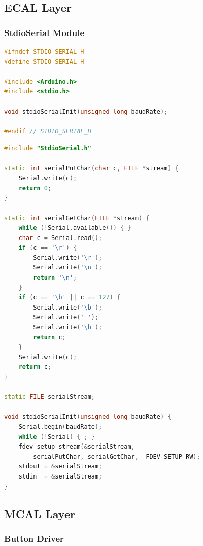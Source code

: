 \subsection{ECAL Layer}

\subsubsection{StdioSerial Module}

\begin{lstlisting}[language=C++, caption=lib/StdioSerial/StdioSerial.h --- printf-to-UART bridge, label=lst:appendix_stdio_h]
#ifndef STDIO_SERIAL_H
#define STDIO_SERIAL_H

#include <Arduino.h>
#include <stdio.h>

void stdioSerialInit(unsigned long baudRate);

#endif // STDIO_SERIAL_H
\end{lstlisting}

\begin{lstlisting}[language=C++, caption=lib/StdioSerial/StdioSerial.cpp --- bridge implementation, label=lst:appendix_stdio_cpp]
#include "StdioSerial.h"

static int serialPutChar(char c, FILE *stream) {
    Serial.write(c);
    return 0;
}

static int serialGetChar(FILE *stream) {
    while (!Serial.available()) { }
    char c = Serial.read();
    if (c == '\r') {
        Serial.write('\r');
        Serial.write('\n');
        return '\n';
    }
    if (c == '\b' || c == 127) {
        Serial.write('\b');
        Serial.write(' ');
        Serial.write('\b');
        return c;
    }
    Serial.write(c);
    return c;
}

static FILE serialStream;

void stdioSerialInit(unsigned long baudRate) {
    Serial.begin(baudRate);
    while (!Serial) { ; }
    fdev_setup_stream(&serialStream,
        serialPutChar, serialGetChar, _FDEV_SETUP_RW);
    stdout = &serialStream;
    stdin  = &serialStream;
}
\end{lstlisting}

\subsection{MCAL Layer}

\subsubsection{Button Driver}

